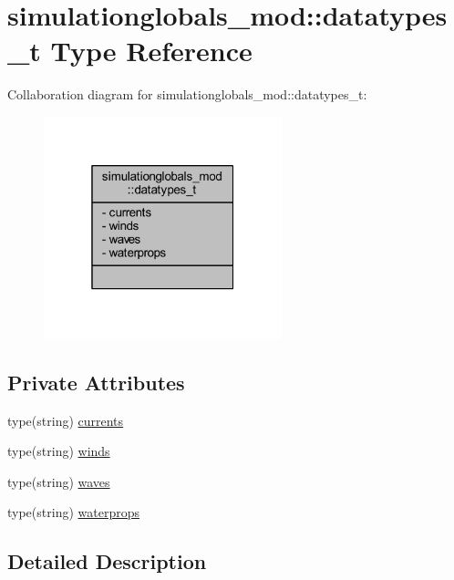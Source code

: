 \hypertarget{structsimulationglobals__mod_1_1datatypes__t}{}\section{simulationglobals\+\_\+mod\+:\+:datatypes\+\_\+t Type Reference}
\label{structsimulationglobals__mod_1_1datatypes__t}


Collaboration diagram for simulationglobals\+\_\+mod\+:\+:datatypes\+\_\+t\+:\nopagebreak
\begin{figure}[H]
\begin{center}
\leavevmode
\includegraphics[width=196pt]{structsimulationglobals__mod_1_1datatypes__t__coll__graph}
\end{center}
\end{figure}
\subsection*{Private Attributes}
\begin{DoxyCompactItemize}
\item 
type(string) \mbox{\hyperlink{structsimulationglobals__mod_1_1datatypes__t_a4d2371a17fd1cf4a96f8b1fa11521a1c}{currents}}
\item 
type(string) \mbox{\hyperlink{structsimulationglobals__mod_1_1datatypes__t_ac8a4ee9292a74da9050bb8b244b43cc7}{winds}}
\item 
type(string) \mbox{\hyperlink{structsimulationglobals__mod_1_1datatypes__t_afd217bb99ac71d289cc2b5b6c8358b60}{waves}}
\item 
type(string) \mbox{\hyperlink{structsimulationglobals__mod_1_1datatypes__t_a6f6b6f49e360e51388cd2a18b18d1d89}{waterprops}}
\end{DoxyCompactItemize}


\subsection{Detailed Description}


